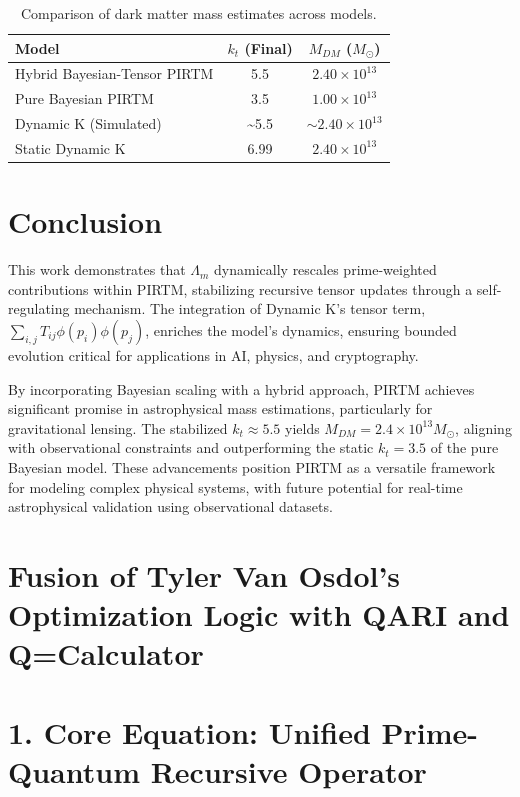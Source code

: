 \documentclass{article}
\theoremstyle{plain}
\begin{document}
\begin{table}[h]
    \centering
    \begin{tabular}{|l|c|c|}
        \hline
        Model & \( k_t \) (Final) & \( M_{DM} \) (\( M_\odot \)) \\
        \hline
        Hybrid Bayesian-Tensor PIRTM & 5.5 & \( 2.40 \times 10^{13} \) \\
        Pure Bayesian PIRTM & 3.5 & \( 1.00 \times 10^{13} \) \\
        Dynamic K (Simulated) & \sim5.5 & \( \sim2.40 \times 10^{13} \) \\
        Static Dynamic K & 6.99 & \( 2.40 \times 10^{13} \) \\
        \hline
    \end{tabular}
    \caption{Comparison of dark matter mass estimates across models.}
    \label{tab:mdm_comparison}
\end{table}

\section{Conclusion}
This work demonstrates that \( \Lambda_m \) dynamically rescales prime-weighted contributions within PIRTM, stabilizing recursive tensor updates through a self-regulating mechanism. The integration of Dynamic K’s tensor term, \( \sum_{i,j} T_{ij} \phi(p_i) \phi(p_j) \), enriches the model’s dynamics, ensuring bounded evolution critical for applications in AI, physics, and cryptography. 

By incorporating Bayesian scaling with a hybrid approach, PIRTM achieves significant promise in astrophysical mass estimations, particularly for gravitational lensing. The stabilized \( k_t \approx 5.5 \) yields \( M_{DM} = 2.4 \times 10^{13} M_\odot \), aligning with observational constraints and outperforming the static \( k_t = 3.5 \) of the pure Bayesian model. These advancements position PIRTM as a versatile framework for modeling complex physical systems, with future potential for real-time astrophysical validation using observational datasets.
\section{Fusion of Tyler Van Osdol’s Optimization Logic with QARI and Q=Calculator}


\section*{1. Core Equation: Unified Prime-Quantum Recursive Operator}
\end{document}

